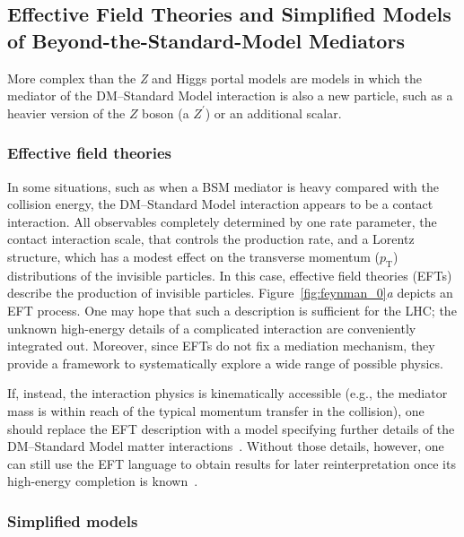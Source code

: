 \documentclass{ar-1col}
\newcommand{\IP}{invisible particle}
\newcommand{\pt}{\ensuremath{p_\mathrm{T}}\xspace}
\begin{document}
{\subsection{Effective Field Theories and Simplified Models of Beyond-the-Standard-Model Mediators}\label{sec:BSMMediatorModels}

More complex than the \textit{Z} and Higgs portal
models are models in which the mediator of the
DM--Standard Model interaction is also a new particle, such
as a heavier version of the $Z$ boson (a $Z^\prime$) or an
additional scalar.

\subsubsection{Effective field theories}\label{sub:EFT}

In some situations, such as when a BSM mediator is heavy compared
with the collision energy, the DM--Standard Model interaction appears to be a
contact interaction. All observables completely determined by
one rate parameter, the contact interaction scale, that controls
the production rate, and a Lorentz structure, which has a
modest effect on the transverse momentum (\pt) distributions of the
{\IP}s. In this case, effective field theories
(EFTs)~\cite{Beltran:2010ww,Goodman:2010ku,Bai:2010hh,Fox:2011pm} describe the production of {\IP}s. Figure~\ref{fig:feynman_0}\textit{a} depicts an EFT
process. One may
hope that such a description is sufficient for the LHC; the
unknown high-energy details of a complicated interaction are
conveniently integrated out. Moreover, since EFTs do not fix a
mediation mechanism, they provide a framework to systematically
explore a wide range of possible physics.

If, instead, the interaction physics is kinematically accessible
(e.g., the mediator mass is within reach of the typical momentum
transfer in the collision), one should replace the EFT description
with a model specifying further details of the DM--Standard Model matter
interactions~\cite{Shoemaker:2011vi}. Without those details,
however, one can still use the EFT language to obtain results for
later reinterpretation once its high-energy completion is known~\cite{Racco:2015dxa,Busoni:2013lha}.

\subsubsection{Simplified models}\label{sub:simplifiedModels}

}
\end{document}
